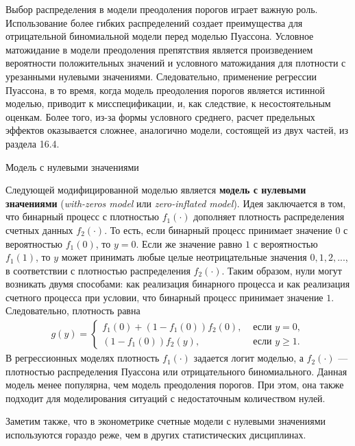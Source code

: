 Выбор распределения в модели преодоления порогов играет важную роль. Использование более гибких распределений создает преимущества для отрицательной биномиальной модели перед моделью Пуассона. Условное матожидание в модели преодоления препятствия является произведением вероятности положительных значений и условного матожидания для плотности с урезанными нулевыми значениями. Следовательно, применение регрессии Пуассона, в то время, когда модель преодоления порогов является истинной моделью, приводит к мисспецификации, и, как следствие, к несостоятельным оценкам. Более того, из-за формы условного среднего, расчет предельных эффектов оказывается сложнее, аналогично модели, состоящей из двух частей, из раздела 16.4.

        \begin{center}{Модель с нулевыми значениями}\end{center}
\noindent
Следующей модифицированной моделью является \textbf{модель с нулевыми значениями} (\textit{with-zeros model} или \textit{zero-inflated model}). Идея заключается в том, что бинарный процесс с плотностью $f_1(\cdot)$ дополняет плотность распределения счетных данных $f_2(\cdot)$. То есть, если бинарный процесс принимает значение $0$ с вероятностью $f_1(0)$, то $y = 0$. Если же значение равно $1$ с вероятностью $f_1(1)$, то $y$ может принимать любые целые неотрицательные значения $0, 1, 2, ...$, в соответствии с плотностью распределения $f_2(\cdot)$. Таким образом, нули могут возникать двумя способами: как реализация бинарного процесса и как реализация счетного процесса при условии, что бинарный процесс принимает значение $1$. Следовательно, плотность равна
    \begin{align}\label{eq:20.19}
    g(y) =\begin{cases}
                f_1(0) + (1 - f_1(0)) f_2(0),              & \text{ если }y = 0, \\
                (1 - f_1(0))f_2(y),                        & \text{ если }y \ge 1.
                \end{cases}
    \end{align}
В регрессионных моделях плотность $f_1(\cdot)$ задается логит моделью, а $f_2(\cdot)$ --- плотностью распределения Пуассона или отрицательного биномиального. Данная модель менее популярна, чем модель преодоления порогов. При этом, она также подходит для моделирования ситуаций с недостаточным количеством нулей.

Заметим также, что в эконометрике счетные модели с нулевыми значениями используются гораздо реже, чем в других статистических дисциплинах.


